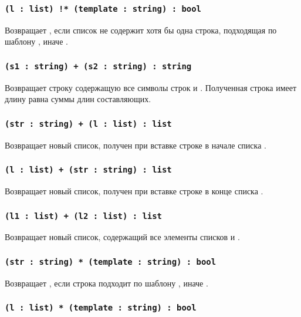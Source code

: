 \subsubsection{\lstinline|(l : list) !* (template : string) : bool|}

Возвращает \true{}, если список  не содержит хотя бы одна строка, подходящая по шаблону , иначе \false{}.

\subsubsection{\lstinline|(s1 : string) + (s2 : string) : string|}

Возвращает строку содержащую все символы строк  и . Полученная строка имеет длину равна суммы длин составляющих.

\subsubsection{\lstinline|(str : string) + (l : list) : list|}

Возвращает новый список, получен при вставке строке  в начале списка .

\subsubsection{\lstinline|(l : list) + (str : string) : list|}

Возвращает новый список, получен при вставке строке  в конце списка .

\subsubsection{\lstinline|(l1 : list) + (l2 : list) : list|}

Возвращает новый список, содержащий все элементы списков  и .

\subsubsection{\lstinline|(str : string) * (template : string) : bool|}

Возвращает \true{}, если строка  подходит по шаблону , иначе \false{}.

\subsubsection{\lstinline|(l : list) * (template : string) : bool|}


